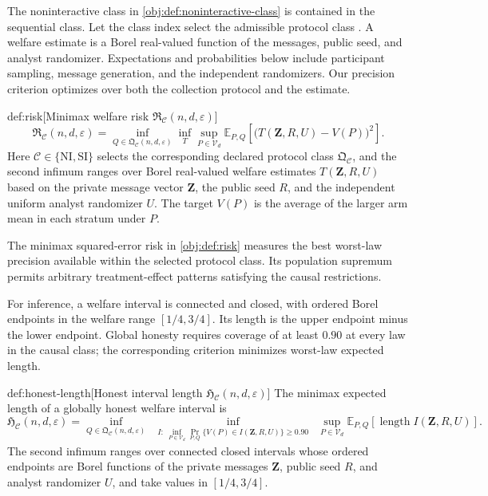 The noninteractive class  in \cref{obj:def:noninteractive-class} is contained in the sequential class. Let the class index  select the admissible protocol class . A welfare estimate  is a Borel real-valued function of the messages, public seed, and analyst randomizer. Expectations and probabilities below include participant sampling, message generation, and the independent randomizers. Our precision criterion optimizes over both the collection protocol and the estimate.

\begin{definitionv}{def:risk}[Minimax welfare risk $\mathfrak R_{\mathcal C}(n,d,\varepsilon)$]
\[
\mathfrak R_{\mathcal C}(n,d,\varepsilon)
=
\inf_{Q\in\mathfrak Q_{\mathcal C}(n,d,\varepsilon)}
\inf_T
\sup_{P\in\mathcal V_d}
\mathbb E_{P,Q}
\left[
\bigl(T(\mathbf Z,R,U)-V(P)\bigr)^2
\right].
\]
Here \(\mathcal C\in\{\mathrm{NI},\mathrm{SI}\}\) selects the corresponding declared protocol class \(\mathfrak Q_{\mathcal C}\), and the second infimum ranges over Borel real-valued welfare estimates \(T(\mathbf Z,R,U)\) based on the private message vector \(\mathbf Z\), the public seed \(R\), and the independent uniform analyst randomizer \(U\). The target \(V(P)\) is the average of the larger arm mean in each stratum under \(P\).
\end{definitionv}

The minimax squared-error risk  in \cref{obj:def:risk} measures the best worst-law precision available within the selected protocol class. Its population supremum permits arbitrary treatment-effect patterns satisfying the causal restrictions.

For inference, a welfare interval  is connected and closed, with ordered Borel endpoints in the welfare range \([1/4,3/4]\). Its length is the upper endpoint minus the lower endpoint. Global honesty requires coverage of at least \(0.90\) at every law in the causal class; the corresponding criterion minimizes worst-law expected length.

\begin{definitionv}{def:honest-length}[Honest interval length $\mathfrak H_{\mathcal C}(n,d,\varepsilon)$]
The minimax expected length of a globally honest welfare interval is
\[
\mathfrak H_{\mathcal C}(n,d,\varepsilon)
=
\inf_{Q\in\mathfrak Q_{\mathcal C}(n,d,\varepsilon)}
\ \inf_{\substack{I:\ \inf_{P\in\mathcal V_d}
\Pr_{P,Q}\{V(P)\in I(\mathbf Z,R,U)\}\ge0.90}}
\ \sup_{P\in\mathcal V_d}
\mathbb E_{P,Q}\!\left[
\operatorname{length} I(\mathbf Z,R,U)
\right].
\]
The second infimum ranges over connected closed intervals whose ordered endpoints are Borel functions of the private messages \(\mathbf Z\), public seed \(R\), and analyst randomizer \(U\), and take values in \([1/4,3/4]\).
\end{definitionv}

